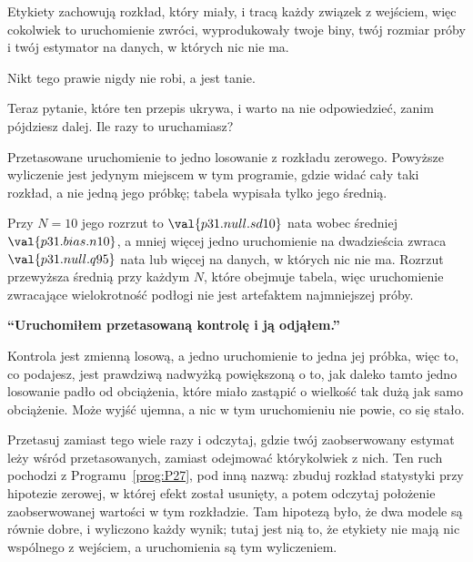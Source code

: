 \begin{fr}

Etykiety zachowują rozkład, który miały, i tracą każdy związek z wejściem,
więc cokolwiek to uruchomienie zwróci, wyprodukowały twoje biny, twój
rozmiar próby i twój estymator na danych, w których nic nie ma.

Nikt tego prawie nigdy nie robi, a jest tanie.

Teraz pytanie, które ten przepis ukrywa, i warto na nie odpowiedzieć, zanim
pójdziesz dalej. Ile razy to uruchamiasz?
\dotline
\nextframe
\end{fr}

\begin{fr}

Przetasowane uruchomienie to jedno losowanie z rozkładu zerowego.
Powyższe wyliczenie jest jedynym miejscem w tym programie, gdzie widać cały
taki rozkład, a nie jedną jego próbkę; tabela wypisała tylko jego średnią.

Przy $N = 10$ jego rozrzut to $\val{p31.null.sd10}$ nata wobec średniej
$\val{p31.bias.n10}$, a mniej więcej jedno uruchomienie na dwadzieścia
zwraca $\val{p31.null.q95}$ nata lub więcej \dash{} na danych, w których
nic nie ma. Rozrzut przewyższa średnią przy każdym $N$, które obejmuje
tabela, więc uruchomienie zwracające wielokrotność podłogi nie jest
artefaktem najmniejszej próby.

\begin{trapbox}
\textbf{\enquote{Uruchomiłem przetasowaną kontrolę i ją odjąłem.}}

Kontrola jest zmienną losową, a jedno uruchomienie to jedna jej próbka,
więc to, co podajesz, jest prawdziwą nadwyżką powiększoną o to, jak daleko
tamto jedno losowanie padło od obciążenia, które miało zastąpić \dash{} o
wielkość tak dużą jak samo obciążenie. Może wyjść ujemna, a nic w tym
uruchomieniu nie powie, co się stało.

Przetasuj zamiast tego wiele razy i odczytaj, gdzie twój zaobserwowany
estymat leży wśród przetasowanych, zamiast odejmować którykolwiek z nich.
Ten ruch pochodzi z Programu~\ref{prog:P27}, pod inną nazwą: zbuduj rozkład
statystyki przy hipotezie zerowej, w której efekt został usunięty, a potem
odczytaj położenie zaobserwowanej wartości w tym rozkładzie. Tam hipotezą
było, że dwa modele są równie dobre, i wyliczono każdy wynik; tutaj jest nią
to, że etykiety nie mają nic wspólnego z wejściem, a uruchomienia są tym
wyliczeniem.
\end{trapbox}

\end{fr}

